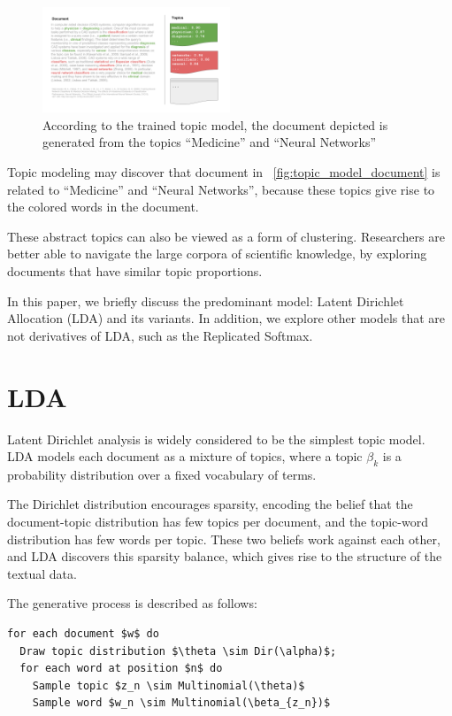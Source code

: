 \documentclass[letterpaper]{article}
\begin{document}
\begin{figure}[ht]
  \centering
  \includegraphics[width=0.5\textwidth]{topic_models.png}
  \caption{\label{fig:topic_model_document} According to the trained
    topic model, the document depicted is generated from the topics
    ``Medicine'' and ``Neural Networks''}
\end{figure}


Topic modeling may discover that document in
~\autoref{fig:topic_model_document} is related to ``Medicine'' and
``Neural Networks'', because these topics give rise to the colored
words in the document.

These abstract topics can also be viewed as a form of clustering.
Researchers are better able to navigate the large corpora of
scientific knowledge, by exploring documents that have similar topic
proportions.

In this paper, we briefly discuss the predominant model: Latent
Dirichlet Allocation (LDA) and its variants. In addition, we explore
other models that are not derivatives of LDA, such as the Replicated
Softmax.

\section{LDA}
Latent Dirichlet analysis is widely considered to be the simplest
topic model. LDA models each document as a mixture of topics, where a
topic $\beta_k$ is a probability distribution over a fixed vocabulary
of terms.

The Dirichlet distribution encourages sparsity, encoding the belief
that the document-topic distribution has few topics per document, and
the topic-word distribution has few words per topic. These two beliefs
work against each other, and LDA discovers this sparsity balance,
which gives rise to the structure of the textual data.

The generative process is described as follows:

\begin{lstlisting}[mathescape=true]
for each document $w$ do
  Draw topic distribution $\theta \sim Dir(\alpha)$;
  for each word at position $n$ do
    Sample topic $z_n \sim Multinomial(\theta)$
    Sample word $w_n \sim Multinomial(\beta_{z_n})$
\end{lstlisting}
\end{document}
